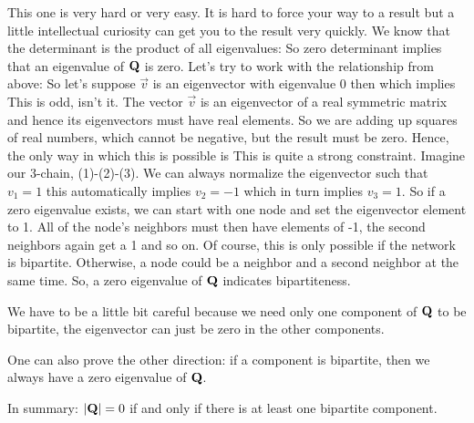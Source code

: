 \solution
This one is very hard or very easy. It is hard to force your way to a result but a little intellectual curiosity can get you to the result very quickly. We know that the determinant is the product of all eigenvalues:
So zero determinant implies that an eigenvalue of $\bf Q$ is zero. Let's try to work with the relationship from above:
So let's suppose $\vec{v}$ is an eigenvector with eigenvalue 0 then 
which implies 
This is odd, isn't it. The vector $\vec{v}$ is an eigenvector of a real symmetric matrix and hence its eigenvectors must have real elements. So we are adding up squares of real numbers, which cannot be negative, but the result must be zero. Hence, the only way in which this is possible is 
This is quite a strong constraint. Imagine our 3-chain, (1)-(2)-(3). We can always normalize the eigenvector such that $v_1=1$ this automatically implies $v_2=-1$ which in turn implies $v_3=1$. So if a zero eigenvalue exists, we can start with one node and set the eigenvector element to 1. All of the node's neighbors must then have elements of -1, the second neighbors again get a 1 and so on. Of course, this is only possible if the network is bipartite. Otherwise, a node could be a neighbor and a second neighbor at the same time. So, a zero eigenvalue of $\bf Q$ indicates bipartiteness. 

We have to be a little bit careful because we need only one component of $\bf Q$ to be bipartite, the eigenvector can just be zero in the other components. 

One can also prove the other direction: if a component is bipartite, then we always have a zero eigenvalue of $\bf Q$. 

In summary: $|{\bf Q}|=0$ if and only if there is at least one bipartite component. 
